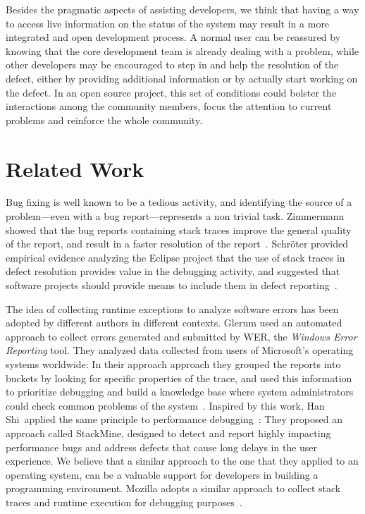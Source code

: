 Besides the pragmatic aspects of assisting developers, we think that having a way to access live information on the status of the system may result in a more integrated and open development process.
A normal user can be reassured by knowing that the core development team is already dealing with a problem, while other developers may be encouraged to step in and help the resolution of the defect, either by providing additional information or by actually start working on the defect.
In an open source project, this set of conditions could bolster the interactions among the community members, focus the attention to current problems and reinforce the whole community.



\section{Related Work}\label{sec:related}

Bug fixing is well known to be a tedious activity, and identifying the source of a problem---even with a bug report---represents a non trivial task.
Zimmermann \etal showed that the bug reports containing stack traces improve the general quality of the report, and result in a faster resolution of the report~\cite{Zimm2010a}.
Schr\"oter \etal provided empirical evidence analyzing the Eclipse project that the use of stack traces in defect resolution provides value in the debugging activity, and suggested that software projects should provide means to include them in defect reporting~\cite{Schr2010a}.

The idea of collecting runtime exceptions to analyze software errors has been adopted by different authors in different contexts.
Glerum \etal used an automated approach to collect errors generated and submitted by WER, the \emph{Windows Error Reporting} tool.
They analyzed data collected from users of Microsoft's operating systems worldwide: In their approach approach they grouped the reports into buckets by looking for specific properties of the trace, and used this information to prioritize debugging and build a knowledge base where system administrators could check common problems of the system~\cite{Glerum2009}.
Inspired by this work, Han Shi~\etal applied the same principle to performance debugging~\cite{Han2012}: They proposed an approach called StackMine, designed to detect and report highly impacting performance bugs and address defects that cause long delays in the user experience.
We believe that a similar approach to the one that they applied to an operating system, can be a valuable support for developers in building a programming environment.
Mozilla adopts a similar approach to collect stack traces and runtime execution for debugging purposes~\cite{McLa2004}.

